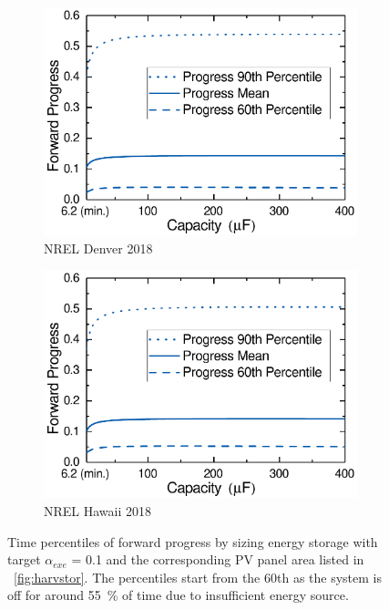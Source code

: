 \begin{figure}
\begin{subfigure}{0.49\columnwidth}
        \centering
        \includegraphics[width=\columnwidth]{ch4_sizingapproach/figures/HarvStorRan2Fig3}
        \caption{NREL Denver 2018}
        \label{fig:harvstorrange3}
    \end{subfigure}
    \begin{subfigure}{0.49\columnwidth}
        \centering
        \includegraphics[width=\columnwidth]{ch4_sizingapproach/figures/HarvStorRan2Fig4}
        \caption{NREL Hawaii 2018}
        \label{fig:harvstorrange4}
    \end{subfigure}
    \caption{Time percentiles of forward progress by sizing energy storage with target $\alpha_{exe}$ = 0.1 and the corresponding PV panel area listed in \figurename{~\ref{fig:harvstor}}. The percentiles start from the 60th as the system is off for around \SI{55}{\percent} of time due to insufficient energy source. }
    \label{fig:harvstorrange}
\end{figure}

